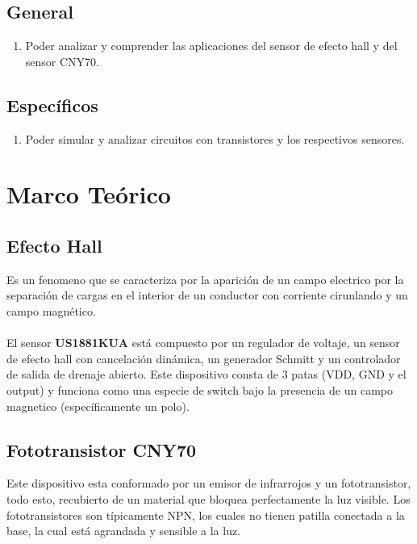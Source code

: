 \documentclass[conference]{IEEEtran}
\begin{document}
\subsection{General}
    \begin{enumerate}[1.]
        \item Poder analizar y comprender las aplicaciones del sensor de efecto hall y del sensor CNY70.
    \end{enumerate}
\subsection{Específicos}
    \begin{enumerate}
        \item Poder simular y analizar circuitos con transistores y los respectivos sensores.
    \end{enumerate}
    
\section{Marco Teórico}
\subsection{Efecto Hall}
Es un fenomeno que se caracteriza por la aparición de un campo electrico por la separación de cargas en el interior de un conductor con corriente cirunlando y un campo magnético. \\\\
El sensor \textbf{US1881KUA} está compuesto por un regulador de voltaje, un sensor de efecto hall con cancelación dinámica, un generador Schmitt y un controlador de salida de drenaje abierto. Este dispositivo consta de 3 patas (VDD, GND y el output) y funciona como una especie de switch bajo la presencia de un campo magnetico (específicamente un polo).

\subsection{Fototransistor CNY70}
Este dispositivo esta conformado por un emisor de infrarrojos y un fototransistor, todo esto, recubierto de un material que bloquea perfectamente la luz visible. Los fototransistores son típicamente NPN, los cuales no tienen patilla conectada a la base, la cual está agrandada y sensible a la luz.
\end{document}
